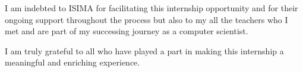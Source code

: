 \documentclass[12pt,a4paper,table,english]{article}
\begin{document}
	I am indebted to ISIMA for facilitating this internship opportunity and for their ongoing support throughout the process but also to my all the teachers who I met and are part of my successing journey as a computer scientist.
			
	I am truly grateful to all who have played a part in making this internship a meaningful and enriching experience.
	
	\pagebreak
	
	\listoffigures
	\pagebreak
	
	\listoftables
	\pagebreak
	
	\listofalgorithms
	\pagebreak
	
	
	\pagebreak

	
	\pagebreak
	
	\tableofcontents
	\newpage
	
	
	\newpage

	\newpage
	
	
	\newpage
	
	
	\newpage
	
	
	\newpage
	
	
	\newpage
	
	
	\newpage
	
	
	\newpage

	

	\newpage
	
	
	\newpage

	
	\newpage
	
	
\end{document}
